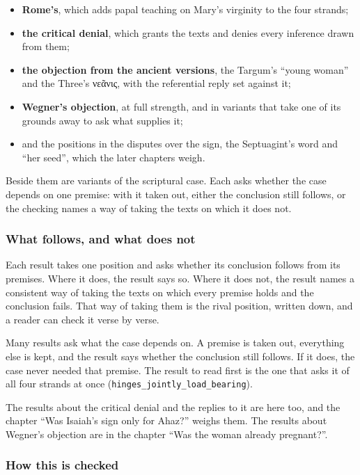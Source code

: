\documentclass[11pt]{article}
\begin{document}
\begin{itemize}
  \item \textbf{Rome’s}, which adds papal teaching on Mary’s virginity to the four strands;
  \item \textbf{the critical denial}, which grants the texts and denies every inference drawn from them;
  \item \textbf{the objection from the ancient versions}, the Targum’s “young woman” and the Three’s νεᾶνις, with the referential reply set against it;
  \item \textbf{Wegner’s objection}, at full strength, and in variants that take one of its grounds away to ask what supplies it;
  \item and the positions in the disputes over the sign, the Septuagint’s word and “her seed”, which the later chapters weigh.
\end{itemize}
Beside them are variants of the scriptural case. Each asks whether the case depends on one premise: with it taken out, either the conclusion still follows, or the checking names a way of taking the texts on which it does not.

\subsubsection*{What follows, and what does not}
Each result takes one position and asks whether its conclusion follows from its premises. Where it does, the result says so. Where it does not, the result names a consistent way of taking the texts on which every premise holds and the conclusion fails. That way of taking them is the rival position, written down, and a reader can check it verse by verse.

Many results ask what the case depends on. A premise is taken out, everything else is kept, and the result says whether the conclusion still follows. If it does, the case never needed that premise. The result to read first is the one that asks it of all four strands at once (\texttt{hinges\_\allowbreak{}jointly\_\allowbreak{}load\_\allowbreak{}bearing}).

The results about the critical denial and the replies to it are here too, and the chapter “Was Isaiah’s sign only for Ahaz?” weighs them. The results about Wegner’s objection are in the chapter “Was the woman already pregnant?”.

\subsubsection*{How this is checked}
\end{document}
